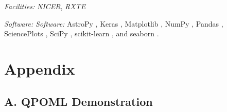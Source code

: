 \documentclass[fleqn,usenatbib,twocolumn]{mnras}%
\begin{document}
\noindent \textit{Facilities:} \textit{NICER}, \textit{RXTE}

\noindent \textit{Software:} \textit{Software:} AstroPy \citep{astropy1,astropy2}, Keras \citep{keras}, Matplotlib \citep{Hunter2007}, NumPy \citep{numpy}, Pandas \citep{pandas}, SciencePlots \citep{SciencePlots}, SciPy \citep{Virtanen2020}, scikit-learn \citep{scikit-learn}, and seaborn \citep{Waskom2021}.

%


\section*{Appendix}
\subsection*{A. QPOML Demonstration} \label{appendix:A}
\newpage
\end{document}
